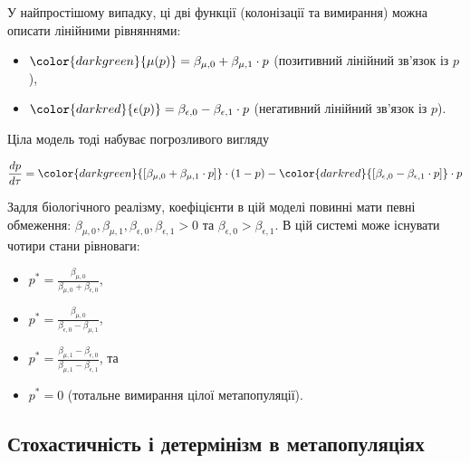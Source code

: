 \documentclass[
  11pt,
]{book}
\begin{document}
У найпростішому випадку, ці дві функції (колонізації та вимирання) можна описати лінійними рівняннями:

\begin{itemize}
\item
  \(\color{darkgreen}{\mu(p)} = \beta_{\mu, 0} + \beta_{\mu, 1} \cdot p\) (позитивний лінійний зв'язок із \(p\)),
\item
  \(\color{darkred}{\epsilon(p)} = \beta_{\epsilon, 0} - \beta_{\epsilon, 1} \cdot p\) (негативний лінійний зв'язок із \(p\)).
\end{itemize}

Ціла модель тоді набуває погрозливого вигляду

\[\frac{dp}{d\tau} = \color{darkgreen}{[\beta_{\mu, 0} + \beta_{\mu, 1} \cdot p]} \cdot (1-p) - \color{darkred}{[\beta_{\epsilon, 0} - \beta_{\epsilon, 1} \cdot p]} \cdot p\]

Задля біологічного реалізму, коефіцієнти в цій моделі повинні мати певні обмеження: \(\beta_{\mu, 0}, \beta_{\mu, 1}, \beta_{\epsilon, 0}, \beta_{\epsilon, 1} > 0\) та \(\beta_{\epsilon, 0} > \beta_{\epsilon, 1}\). В цій системі може існувати чотири стани рівноваги:

\begin{itemize}
\item
  \(p^* = \frac{\beta_{\mu, 0}}{\beta_{\mu, 0} + \beta_{\epsilon, 0}}\),
\item
  \(p^* = \frac{\beta_{\mu, 0}}{\beta_{\epsilon, 0} - \beta_{\mu, 1}}\),
\item
  \(p^* = \frac{\beta_{\mu, 1} - \beta_{\epsilon, 0}}{\beta_{\mu, 1} - \beta_{\epsilon, 1}}\), та
\item
  \(p^* = 0\) (тотальне вимирання цілої метапопуляції).
\end{itemize}

\subsection{Стохастичність і детермінізм в метапопуляціях}\label{ux441ux442ux43eux445ux430ux441ux442ux438ux447ux43dux456ux441ux442ux44c-ux456-ux434ux435ux442ux435ux440ux43cux456ux43dux456ux437ux43c-ux432-ux43cux435ux442ux430ux43fux43eux43fux443ux43bux44fux446ux456ux44fux445}
\end{document}

